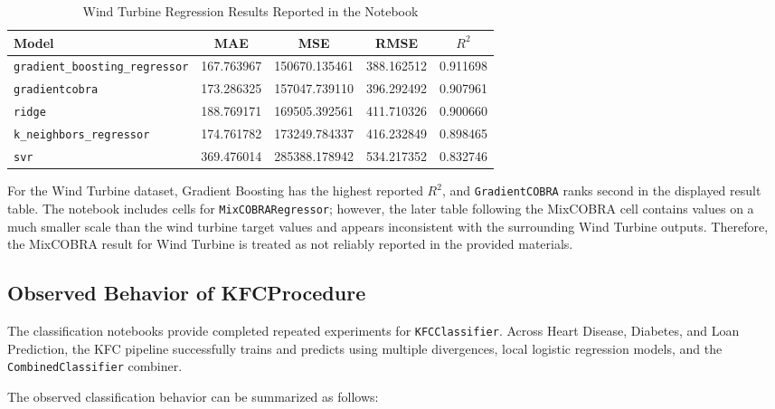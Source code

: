 \begin{table}[H]
    \centering
    \caption{Wind Turbine Regression Results Reported in the Notebook}
    \label{tab:wind_results}
    \small
    \begin{tabular}{l c c c c}
        \hline
        \textbf{Model}                       & \textbf{MAE} & \textbf{MSE}  & \textbf{RMSE} & \textbf{$R^2$} \\
        \hline
        \texttt{gradient\_boosting\_regressor} & 167.763967   & 150670.135461 & 388.162512    & 0.911698 \\
        \texttt{gradientcobra}               & 173.286325   & 157047.739110 & 396.292492    & 0.907961 \\
        \texttt{ridge}                       & 188.769171   & 169505.392561 & 411.710326    & 0.900660 \\
        \texttt{k\_neighbors\_regressor}       & 174.761782   & 173249.784337 & 416.232849    & 0.898465 \\
        \texttt{svr}                         & 369.476014   & 285388.178942 & 534.217352    & 0.832746 \\
        \hline
    \end{tabular}
\end{table}

For the Wind Turbine dataset, Gradient Boosting has the highest reported $R^2$, and \texttt{GradientCOBRA} ranks second in the displayed result table. The notebook includes cells for \texttt{MixCOBRARegressor}; however, the later table following the MixCOBRA cell contains values on a much smaller scale than the wind turbine target values and appears inconsistent with the surrounding Wind Turbine outputs. Therefore, the MixCOBRA result for Wind Turbine is treated as not reliably reported in the provided materials.

\subsection{Observed Behavior of KFCProcedure}

The classification notebooks provide completed repeated experiments for \texttt{KFCClassifier}. Across Heart Disease, Diabetes, and Loan Prediction, the KFC pipeline successfully trains and predicts using multiple divergences, local logistic regression models, and the \texttt{CombinedClassifier} combiner.

The observed classification behavior can be summarized as follows:

